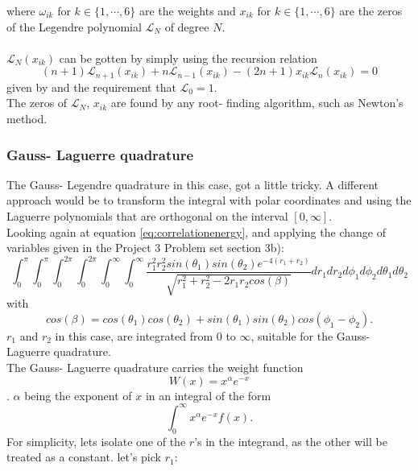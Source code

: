 \documentclass[10pt,a4paper]{article}
\begin{document}
where $\omega_{ik}$ for $k \in\{1,\cdots,6\}$ are the weights and $x_{ik}$ for $k \in\{1,\cdots,6\}$ are the zeros of the Legendre polynomial $\mathcal{L}_N$ of degree $N$.\\\\$\mathcal{L}_N(x_{ik})$ can be gotten by simply using the recursion relation
\begin{equation}
 (n+1)\mathcal{L}_{n+1}(x_{ik})+n\mathcal{L}_{n-1}(x_{ik})-(2n+1)x_{ik}\mathcal{L}_n(x_{ik})=0
\end{equation}
given by \cite{Lecture_Notes_Fall_2015}
and the requirement that $\mathcal{L}_0=1$.\\The zeros of $\mathcal{L}_N$, $x_{ik}$ are found by any root- finding algorithm, such as Newton's method. 
\subsubsection{Gauss- Laguerre quadrature}
The Gauss- Legendre quadrature in this case, got a little tricky. A different approach would be to transform the integral with polar coordinates and using the Laguerre polynomials that are orthogonal on the interval $[0,\infty]$.\\Looking again at equation \ref{eq:correlationenergy}, and applying the change of variables given in the Project 3 Problem set \cite{Problem_set_3} section 3b):
\begin{equation}\label{Big ass integral in polar coordinates}
\int_{0}^{\pi}\int_{0}^{\pi}\int_{0}^{2\pi}\int_{0}^{2\pi}\int_{0}^{\infty}\int_{0}^{\infty}
\frac{r_1^2r_2^2sin(\theta_1)sin(\theta_2)e^{-4(r_1+r_2)}}{\sqrt{r_1^2+r_2^2-2r_1r_2cos(\beta)}}dr_1dr_2d\phi_1d\phi_2d\theta_1d\theta_2
\end{equation}
with
\begin{equation*}
cos(\beta)=cos(\theta_1)cos(\theta_2)+sin(\theta_1)sin(\theta_2)cos(\phi_1-\phi_2).
\end{equation*}
$r_1$ and $r_2$ in this case, are integrated from $0$ to $\infty$, suitable for the Gauss- Laguerre quadrature.\\The Gauss- Laguerre quadrature carries the weight function
\begin{equation}
W(x)=x^\alpha e^{-x}
\end{equation}
\cite{Lecture_Notes_Fall_2015}. $\alpha$ being the exponent of $x$ in an integral of the form
\begin{equation}
\int_0^{\infty}x^{\alpha}e^{-x}f(x).
\end{equation}
For simplicity, lets isolate one of the $r$'s in the integrand, as the other will be treated as a constant. let's pick $r_1$:
\end{document}
